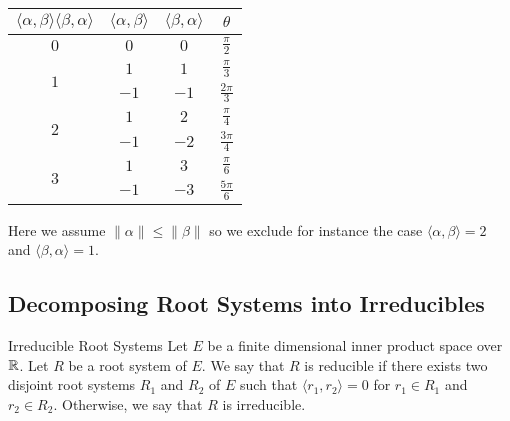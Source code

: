 \documentclass[a4paper]{article}
\begin{document}
\begin{table}[!h]
\centering
\begin{tabular}{|c|c|c|c|}
\hline
$\langle\alpha,\beta\rangle\langle\beta,\alpha\rangle$ & $\langle\alpha,\beta\rangle$ & $\langle\beta,\alpha\rangle$ & $\theta$         \\ \hline
$0$                                                    & $0$                          & $0$                          & $\frac{\pi}{2}$  \\[1.5ex] \hline
\multirow{2}{*}{$1$}                                   & $1$                          & $1$                          & $\frac{\pi}{3}$  \\[1.5ex] \cline{2-4} 
                                                       & $-1$                         & $-1$                         & $\frac{2\pi}{3}$ \\[1.5ex] \hline
\multirow{2}{*}{$2$}                                   & $1$                          & $2$                          & $\frac{\pi}{4}$  \\[1.5ex] \cline{2-4} 
                                                       & $-1$                         & $-2$                         & $\frac{3\pi}{4}$ \\[1.5ex] \hline
\multirow{2}{*}{$3$}                                   & $1$                          & $3$                          & $\frac{\pi}{6}$  \\[1.5ex] \cline{2-4} 
                                                       & $-1$                         & $-3$                         & $\frac{5\pi}{6}$ \\[1.5ex] \hline
\end{tabular}
\end{table}

Here we assume $\|\alpha\|\leq\|\beta\|$ so we exclude for instance the case $\langle\alpha,\beta\rangle=2$ and $\langle\beta,\alpha\rangle=1$. 

\subsection{Decomposing Root Systems into Irreducibles}
\begin{defn}{Irreducible Root Systems}{} Let $E$ be a finite dimensional inner product space over $\mathbb{R}$. Let $R$ be a root system of $E$. We say that $R$ is reducible if there exists two disjoint root systems $R_1$ and $R_2$ of $E$ such that $\langle r_1,r_2\rangle=0$ for $r_1\in R_1$ and $r_2\in R_2$. Otherwise, we say that $R$ is irreducible. 
\end{defn}
\end{document}
